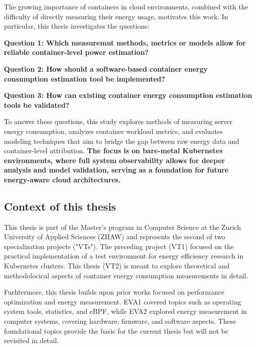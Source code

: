 The growing importance of containers in cloud environments, combined with the difficulty of directly measuring their energy usage, motivates this work. In particular, this thesis investigates the questions:

\textbf{Question 1: Which measuremnt methods, metrics or models allow for reliable container-level power estimation?}

\textbf{Question 2: How should a software-based container energy consumption estimation tool be implemented?}

\textbf{Question 3: How can existing container energy consumption estimation tools be validated?}

To answer these questions, this study explores methods of measuring server energy consumption, analyzes container workload metrics, and evaluates modeling techniques that aim to bridge the gap between raw energy data and container-level attribution. \textbf{The focus is on bare-metal Kubernetes environments, where full system observability allows for deeper analysis and model validation, serving as a foundation for future energy-aware cloud architectures.} 

\subsection{Context of this thesis}

This thesis is part of the Master's program in Computer Science at the Zurich University of Applied Sciences (ZHAW) and represents the second of two specialization projects ("VTs"). The preceding project (VT1) focused on the practical implementation of a test environment for energy efficiency research in Kubernetes clusters. This thesis (VT2) is meant to explore theoretical and methodolocical aspects of container energy consumption measurements in detail.

Furhtermore, this thesis builds upon prior works focused on performance optimization and energy measurement. EVA1 covered topics such as operating system tools, statistics, and eBPF, while EVA2 explored energy measurement in computer systems, covering hardware, firmware, and software aspects. These foundational topics provide the basis for the current thesis but will not be revisited in detail.


